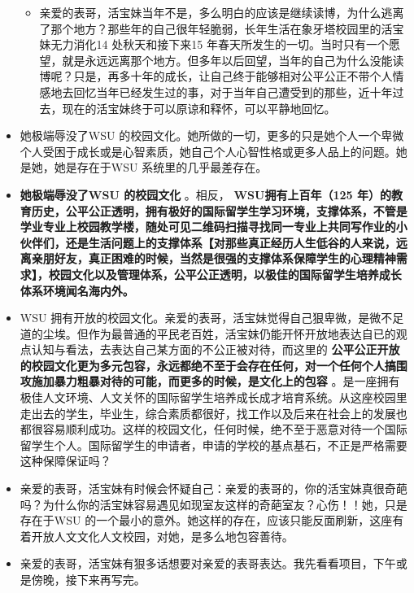 \documentclass[9pt, b5paper]{article}
\begin{document}
\begin{itemize}
\begin{itemize}
\item 亲爱的表哥，活宝妹当年不是，多么明白的应该是继续读博，为什么逃离了那个地方？那些年的自己很年轻脆弱，长年生活在象牙塔校园里的活宝妹无力消化14 处秋天和接下来15 年春天所发生的一切。当时只有一个愿望，就是永远远离那个地方。但多年以后回望，当年的自己为什么没能读博呢？只是，再多十年的成长，让自己终于能够相对公平公正不带个人情感地去回忆当年已经发生过的事，对于当年自己遭受到的那些，近十年过去，现在的活宝妹终于可以原谅和释怀，可以平静地回忆。
\end{itemize}
\item 她极端辱没了WSU 的校园文化。她所做的一切，更多的只是她个人一个卑微个人受困于成长或是心智素质，她自己个人心智性格或更多人品上的问题。她是她，她是存在于WSU 系统里的几乎最差存在。
\item \textbf{她极端辱没了WSU 的校园文化} 。相反， \textbf{WSU拥有上百年（125 年）的教育历史，公平公正透明，拥有极好的国际留学生学习环境，支撑体系，不管是学业专业上校园教学楼，随处可见二维码扫描寻找同一专业上共同写作业的小伙伴们，还是生活问题上的支撑体系【对那些真正经历人生低谷的人来说，远离亲朋好友，真正困难的时候，当然是很强的支撑体系保障学生的心理精神需求】，校园文化以及管理体系，公平公正透明，以极佳的国际留学生培养成长体系环境闻名海内外。}
\item WSU 拥有开放的校园文化。亲爱的表哥，活宝妹觉得自己狠卑微，是微不足道的尘埃。但作为最普通的平民老百姓，活宝妹仍能开怀开放地表达自已的观点认知与看法，去表达自己某方面的不公正被对待，而这里的 \textbf{公平公正开放的校园文化更为多元包容，永远都绝不至于会存在任何，对一个任何个人搞围攻施加暴力粗暴对待的可能，而更多的时候，是文化上的包容} 。是一座拥有极佳人文环境、人文关怀的国际留学生培养成长成才培育系统。从这座校园里走出去的学生，毕业生，综合素质都很好，找工作以及后来在社会上的发展也都很容易顺利成功。这样的校园文化，任何时候，绝不至于恶意对待一个国际留学生个人。国际留学生的申请者，申请的学校的基点基石，不正是严格需要这种保障保证吗？
\item 亲爱的表哥，活宝妹有时候会怀疑自己：亲爱的表哥的，你的活宝妹真很奇葩吗？为什么你的活宝妹容易遇见如现室友这样的奇葩室友？心伤！！她，只是存在于WSU 的一个最小的意外。她这样的存在，应该只能反面刷新，这座有着开放人文文化人文校园，对她，是多么地包容善待。
\item 亲爱的表哥，活宝妹有狠多话想要对亲爱的表哥表达。我先看看项目，下午或是傍晚，接下来再写完。
\end{itemize}
\end{document}
